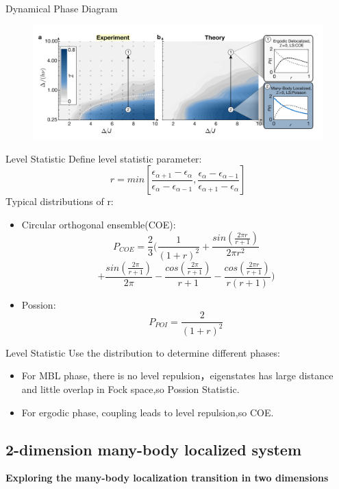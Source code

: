 \documentclass{beamer}
\begin{document}
\begin{frame}{Dynamical Phase Diagram}
  \begin{figure}
  \includegraphics[width=1\linewidth]{Phasegram}
  \end{figure}
\end{frame}

\begin{frame}{Level Statistic}
Define level statistic parameter:
$$r=min[\frac{\epsilon_{\alpha+1}-{\epsilon}_\alpha}{{\epsilon}_\alpha-{\epsilon}_{\alpha-1}},\frac{\epsilon_{\alpha}-{\epsilon}_{\alpha-1}}{{\epsilon}_{\alpha+1}-{\epsilon}_{\alpha}}]$$
Typical distributions of r:
\begin{itemize}
  \item Circular orthogonal ensemble(COE):$$P_{COE}=\frac{2}{3}(\frac{1}{(1+r)^2}+\frac{sin(\frac{2\pi r}{r+1})}{2\pi r^2}$$
  $$+\frac{sin(\frac{2\pi }{r+1})}{2\pi}-\frac{cos(\frac{2\pi }{r+1})}{r+1}-\frac{cos(\frac{2\pi r}{r+1})}{r(r+1)})$$
  \item Possion:$$P_{POI}=\frac{2}{(1+r)^2}$$
\end{itemize}
\end{frame}

\begin{frame}{Level Statistic}
Use the distribution to determine different phases:
\begin{itemize}
\item For MBL phase, there is no level repulsion，eigenstates has large distance and little overlap in Fock space,so Possion Statistic.
\item For ergodic phase, coupling leads to level repulsion,so COE.
\end{itemize}
\end{frame}

\subsection{2-dimension many-body localized system}
\begin{frame}
\begin{center}
  \textbf{Exploring the many-body localization transition in two dimensions}
\end{center}
\end{frame}
\end{document}
